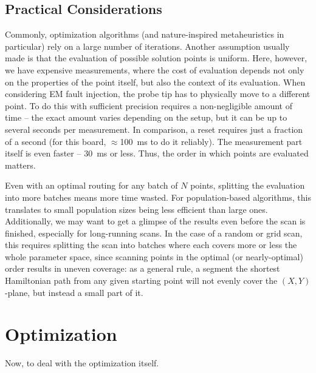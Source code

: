 \documentclass[times, utf8, diplomski]{fer}
\begin{document}
\section{Practical Considerations}\label{sec:practical_considerations}
Commonly, optimization algorithms (and nature-inspired metaheuristics in
particular) rely on a large number of iterations. Another assumption usually
made is that the evaluation of possible solution points is uniform. Here,
however, we have expensive measurements, where the cost of evaluation depends
not only on the properties of the point itself, but also the context of its
evaluation.
%
When considering EM fault injection, the probe tip has to physically move to
a different point. To do this with sufficient precision requires a non-negligible
amount of time -- the exact amount varies depending on the setup, but it can be
up to several seconds per measurement. In comparison, a reset requires just a
fraction of a second (for this board, $\approx$\SI{100}{\milli\second} to do it
reliably). The measurement part itself is even faster -- \SI{30}{\milli\second}
or less. Thus, the order in which points are evaluated matters.

Even with an optimal routing for any batch of $N$ points, splitting the
evaluation into more batches means more time wasted. For population-based
algorithms, this translates to small population sizes being less efficient
than large ones. Additionally, we may want to get a glimpse of the results
even before the scan is finished, especially for long-running scans. In the
case of a random or grid scan, this requires splitting the scan into batches
where each covers more or less the whole parameter space, since scanning points
in the optimal (or nearly-optimal) order results in uneven coverage: as a
general rule, a segment the shortest Hamiltonian path from any given starting
point will not evenly cover the $(X,Y)$-plane, but instead a small part of it.




\chapter{Optimization}\label{ch:optimization}
Now, to deal with the optimization itself.
\end{document}
